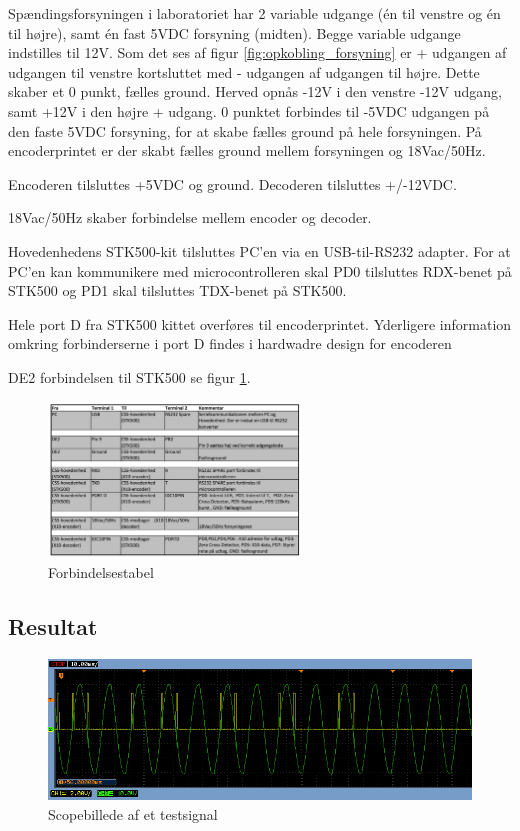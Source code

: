Spændingsforsyningen i laboratoriet har 2 variable udgange (én til venstre og én til højre), samt én fast 5VDC forsyning (midten). Begge variable udgange indstilles til 12V. 
Som det ses af figur \ref{fig:opkobling_forsyning} er + udgangen af udgangen til venstre kortsluttet med - udgangen af udgangen til højre. Dette skaber et 0 punkt, fælles ground. Herved opnås -12V i den venstre -12V udgang, samt +12V i den højre + udgang. 0 punktet forbindes til -5VDC udgangen på den faste 5VDC forsyning, for at skabe fælles ground på hele forsyningen. På encoderprintet er der skabt fælles ground mellem forsyningen og 18Vac/50Hz.

Encoderen tilsluttes +5VDC og ground.
Decoderen tilsluttes +/-12VDC.

18Vac/50Hz skaber forbindelse mellem encoder og decoder.

Hovedenhedens STK500-kit tilsluttes PC'en via en USB-til-RS232 adapter. For at PC'en kan kommunikere med microcontrolleren skal PD0 tilsluttes RDX-benet på STK500 og PD1 skal tilsluttes TDX-benet på STK500. 

Hele port D fra STK500 kittet overføres til encoderprintet. Yderligere information omkring forbinderserne i port D findes i hardwadre design for encoderen

DE2 forbindelsen til STK500 se figur \ref{fig:integration_tabel}.

\begin{figure}[H]
	\centering
	\includegraphics[width=0.6\textwidth]{billeder/IntTest/Integration_tabel}
	\caption{Forbindelsestabel}
	\label{fig:integration_tabel}
\end{figure}

\subsection{Resultat}

\begin{figure}[H]
	\centering
	\includegraphics[width=\textwidth]{billeder/IntTest/Modtager_0101_ON}
	\caption{Scopebillede af et testsignal}
	\label{fig:Modtager_0101_ON}
\end{figure}


